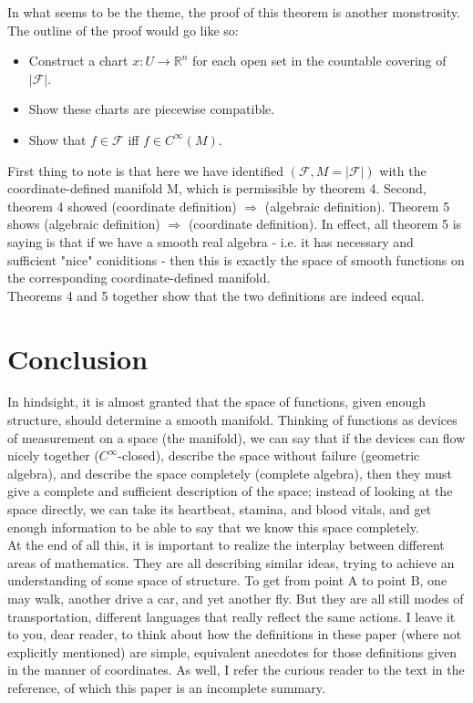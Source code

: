 \documentclass[12pt]{extarticle}
\newcommand\Reals{{\mathbb{R}}}
\newcommand{\ff}{\mathcal{F}}
\begin{document}
In what seems to be the theme, the proof of this theorem is another monstrosity. The outline of the proof would go like so:
\begin{itemize}
\item
Construct a chart $x:U\to\Reals^n$ for each open set in the countable covering of $|\ff|$.
\item
Show these charts are piecewise compatible.
\item
Show that $f\in\ff$ iff $f\in C^\infty(M)$.
\end{itemize}
First thing to note is that here we have identified $(\ff, M=|\ff|)$ with the coordinate-defined manifold M, which is permissible by theorem 4. Second, theorem 4 showed (coordinate definition) $\Rightarrow$ (algebraic definition). Theorem 5 shows (algebraic definition) $\Rightarrow$ (coordinate definition). In effect, all theorem 5 is saying is that if we have a smooth real algebra - i.e. it has necessary and sufficient "nice" coniditions - then this is exactly the space of smooth functions on the corresponding coordinate-defined manifold.\\
Theorems 4 and 5 together show that the two definitions are indeed equal.
\part{Conclusion}
In hindsight, it is almost granted that the space of functions, given enough structure, should determine a smooth manifold. Thinking of functions as devices of measurement on a space (the manifold), we can say that if the devices can flow nicely together ($C^\infty$-closed), describe the space without failure (geometric algebra), and describe the space completely (complete algebra), then they must give a complete and sufficient description of the space; instead of looking at the space directly, we can take its heartbeat, stamina, and blood vitals, and get enough information to be able to say that we know this space completely.\\
At the end of all this, it is important to realize the interplay between different areas of mathematics. They are all describing similar ideas, trying to achieve an understanding of some space of structure. To get from point A to point B, one may walk, another drive a car, and yet another fly. But they are all still modes of transportation, different languages that really reflect the same actions. I leave it to you, dear reader, to think about how the definitions in these paper (where not explicitly mentioned) are simple, equivalent anecdotes for those definitions given in the manner of coordinates. As well, I refer the curious reader to the text in the reference, of which this paper is an incomplete summary.

\nocite{*}

\end{document}

